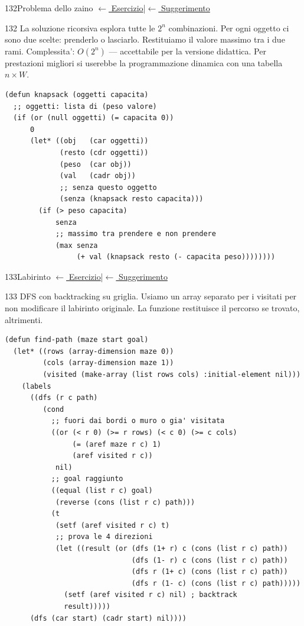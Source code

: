 \label{sol:132}
\begin{solbox}{132}{Problema dello zaino}
\small\color{black!55}\hyperref[ex:132]{$\leftarrow$ Esercizio}\enspace\textcolor{black!30}{|}\enspace\hyperref[hint:132]{$\leftarrow$ Suggerimento}\normalsize\color{black}
\begin{ragionamentoBox}{132}
La soluzione ricorsiva esplora tutte le $2^n$ combinazioni.
Per ogni oggetto ci sono due scelte: prenderlo o lasciarlo.
Restituiamo il valore massimo tra i due rami.
Complessita': $O(2^n)$ — accettabile per la versione didattica.
Per prestazioni migliori si userebbe la programmazione
dinamica con una tabella $n \times W$.
\end{ragionamentoBox}
\begin{lstlisting}
(defun knapsack (oggetti capacita)
  ;; oggetti: lista di (peso valore)
  (if (or (null oggetti) (= capacita 0))
      0
      (let* ((obj   (car oggetti))
             (resto (cdr oggetti))
             (peso  (car obj))
             (val   (cadr obj))
             ;; senza questo oggetto
             (senza (knapsack resto capacita)))
        (if (> peso capacita)
            senza
            ;; massimo tra prendere e non prendere
            (max senza
                 (+ val (knapsack resto (- capacita peso))))))))
\end{lstlisting}
\end{solbox}

\label{sol:133}
\begin{solbox}{133}{Labirinto}
\small\color{black!55}\hyperref[ex:133]{$\leftarrow$ Esercizio}\enspace\textcolor{black!30}{|}\enspace\hyperref[hint:133]{$\leftarrow$ Suggerimento}\normalsize\color{black}
\begin{ragionamentoBox}{133}
DFS con backtracking su griglia. Usiamo un array separato
per i visitati per non modificare il labirinto originale.
La funzione restituisce il percorso se trovato,  altrimenti.
\end{ragionamentoBox}
\begin{lstlisting}
(defun find-path (maze start goal)
  (let* ((rows (array-dimension maze 0))
         (cols (array-dimension maze 1))
         (visited (make-array (list rows cols) :initial-element nil)))
    (labels
      ((dfs (r c path)
         (cond
           ;; fuori dai bordi o muro o gia' visitata
           ((or (< r 0) (>= r rows) (< c 0) (>= c cols)
                (= (aref maze r c) 1)
                (aref visited r c))
            nil)
           ;; goal raggiunto
           ((equal (list r c) goal)
            (reverse (cons (list r c) path)))
           (t
            (setf (aref visited r c) t)
            ;; prova le 4 direzioni
            (let ((result (or (dfs (1+ r) c (cons (list r c) path))
                              (dfs (1- r) c (cons (list r c) path))
                              (dfs r (1+ c) (cons (list r c) path))
                              (dfs r (1- c) (cons (list r c) path)))))
              (setf (aref visited r c) nil) ; backtrack
              result)))))
      (dfs (car start) (cadr start) nil))))
\end{lstlisting}
\end{solbox}

